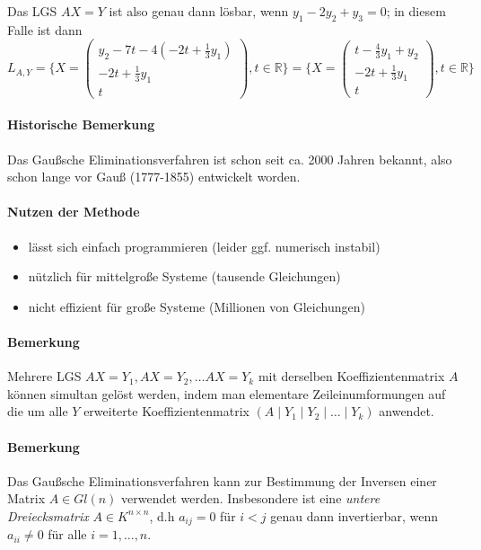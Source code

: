 	 Das LGS $ AX=Y $ ist also genau dann lösbar, wenn $ y_1-2y_2+y_3 = 0 $; in diesem Falle ist dann
	 	\[ L_{A,Y} = \{X =
	 		\begin{pmatrix} y_2-7t-4(-2t+\frac{1}{3}y_1)\\-2t+\frac{1}{3}y_1\\t\end{pmatrix}
	 	, t\in \mathbb{R}\}
	 	= \{X =
	 		\begin{pmatrix} t-\frac{4}{3}y_1+y_2\\-2t+\frac{1}{3}y_1\\t\end{pmatrix}
	 	, t\in \mathbb{R}\} \]
\paragraph{Historische Bemerkung}
	Das Gaußsche Eliminationsverfahren ist schon seit ca. 2000 Jahren bekannt, also schon lange vor Gauß (1777-1855) entwickelt worden.
	
\paragraph{Nutzen der Methode}
	\begin{itemize}
		\item lässt sich einfach programmieren (leider ggf. numerisch instabil)
		\item nützlich für mittelgroße Systeme (tausende Gleichungen)
		\item nicht effizient für große Systeme (Millionen von Gleichungen)
	\end{itemize}
\paragraph{Bemerkung}
	Mehrere LGS $ AX = Y_1, AX = Y_2, \dots AX = Y_k $ mit derselben Koeffizientenmatrix $ A $ können simultan gelöst werden, indem man elementare Zeileinumformungen auf die um alle $ Y $ erweiterte Koeffizientenmatrix $ (A\mid Y_1\mid Y_2\mid \dots \mid Y_k) $ anwendet.
\paragraph{Bemerkung}
	Das Gaußsche Eliminationsverfahren kann zur Bestimmung der Inversen einer Matrix $ A\in Gl(n) $ verwendet werden. Insbesondere ist eine \emph{untere Dreiecksmatrix} $ A\in K^{n\times n} $, d.h $ a_{ij} = 0 $ für $ i<j $ genau dann invertierbar, wenn $ a_{ii}\neq 0 $ für alle $ i=1,\dots,n $.
